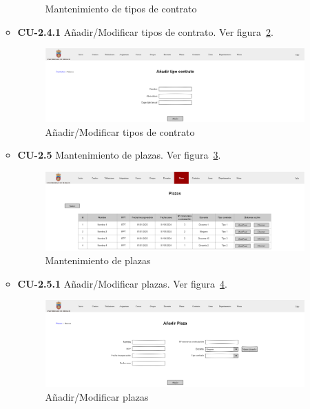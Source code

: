 \begin{itemize}
\begin{itemize}
\begin{figure}[!h]
		\caption{Mantenimiento de tipos de contrato}\label{F-CU2_4}
		\end{figure}
		\FloatBarrier
\newpage
		\item \textbf{CU-2.4.1} Añadir/Modificar tipos de contrato. Ver figura~\ref{F-CU2_4_1}.
		\begin{figure}[!h]
		\centering
		\includegraphics[width=\textwidth]{../img/Anexos/Vistas/add_contrato.png}
		\caption{Añadir/Modificar tipos de contrato}\label{F-CU2_4_1}
		\end{figure}
		\FloatBarrier
		\item \textbf{CU-2.5} Mantenimiento de plazas. Ver figura~\ref{F-CU2_5}.
		\begin{figure}[!h]
		\centering
		\includegraphics[width=\textwidth]{../img/Anexos/Vistas/plazas.png}
		\caption{Mantenimiento de plazas}\label{F-CU2_5}
		\end{figure}
		\FloatBarrier
\newpage
		\item \textbf{CU-2.5.1} Añadir/Modificar plazas. Ver figura~\ref{F-CU2_5_1}.
		\begin{figure}[!h]
		\centering
		\includegraphics[width=\textwidth]{../img/Anexos/Vistas/add_plaza.png}
		\caption{Añadir/Modificar plazas}\label{F-CU2_5_1}
		\end{figure}

\end{itemize}
\end{itemize}
